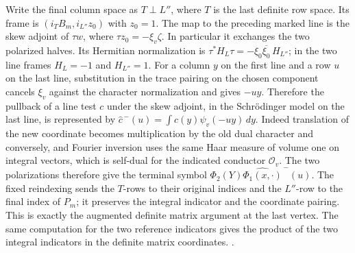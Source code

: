 Write the final column space as \(T\perp L''\), where \(T\)
is the last definite row space. Its frame is
\((i_T B_m,i_{L''}z_0)\) with \(z_0=1\). The map to the
preceding marked line is the skew adjoint of \(\tau w\),
where \(\tau z_0=-\xi_v\zeta\). In particular it exchanges the
two polarized halves. Its Hermitian normalization is
\(\tau^*H_L\tau=-\xi_0\overline{\xi_0}\,H_{L''}\);
in the two line frames \(H_L=-1\) and \(H_{L''}=1\).
For a column \(y\) on the first line and a row \(u\) on
the last line, substitution in the trace pairing on the chosen
component cancels \(\xi_v\) against the character normalization
and gives \(-uy\). Therefore the pullback of a line test \(c\)
under the skew adjoint, in the Schr\"odinger model on the last
line, is represented by
\(\widehat c^{\, -}(u)=\int c(y)\psi_v(-uy)\,dy\).
Indeed translation of the new coordinate becomes multiplication
by the old dual character and conversely, and Fourier inversion
uses the same Haar measure of volume one on integral vectors,
which is self-dual for the indicated conductor \(\mathcal O_v\).
The two polarizations therefore give the terminal symbol
\(\Phi_2(Y)\widehat{\Phi_1(x,\cdot)}^{\, -}(u)\).
The fixed reindexing sends the \(T\)-rows to their original
indices and the \(L''\)-row to the final index of \(P_m\);
it preserves the integral indicator and the coordinate pairing.
This is exactly the augmented definite matrix argument at the
last vertex. The same computation for the two reference
indicators gives the product of the two integral indicators in
the definite matrix coordinates.
.

